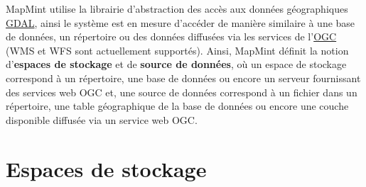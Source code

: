 \documentclass[letterpaper,10pt,french]{sphinxmanual}
\begin{document}
MapMint utilise la librairie d'abstraction des accès aux données
géographiques \href{http://www.gdal.org}{GDAL}, ainsi le système est en
mesure d'accéder de manière similaire à une base de données, un
répertoire ou des données diffusées via les services de l'\href{http://www.opengeospatial.org}{OGC} (WMS et WFS sont actuellement
supportés). Ainsi, MapMint définit la notion d'\textbf{espaces de stockage}
et de \textbf{source de données}, où un espace de stockage correspond à un
répertoire, une base de données ou encore un serveur fournissant des
services web OGC et, une source de données correspond à un fichier
dans un répertoire, une table géographique de la base de données ou
encore une couche disponible diffusée via un service web OGC.


\section{Espaces de stockage}
\end{document}

